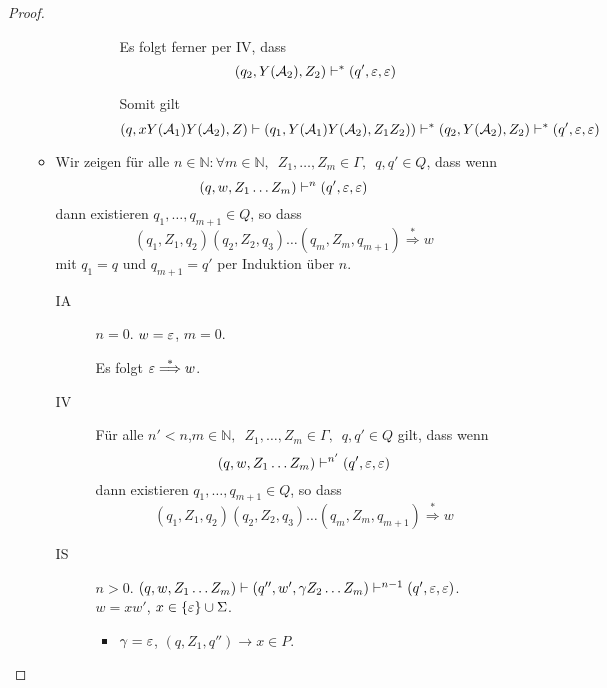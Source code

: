 \begin{proof}
\begin{itemize}
\begin{itemize}
\begin{description}
\begin{itemize}
          Es folgt ferner per IV, dass
          \begin{displaymath}
            (q_2, Y(\mathcal{A}_2), Z_2) \vdash^* (q', \varepsilon, \varepsilon)
          \end{displaymath}

          Somit gilt
          \begin{displaymath}
            (q, xY(\mathcal{A}_1)Y(\mathcal{A}_2), Z) \vdash (q_1, Y(\mathcal{A}_1)Y(\mathcal{A}_2), Z_1Z_2)) \vdash^* (q_2, Y(\mathcal{A}_2), Z_2) \vdash^* (q', \varepsilon, \varepsilon)
          \end{displaymath}
          
          
        \end{itemize}
      \end{description}

    \item Wir zeigen für alle $n \in \mathbb{N}: \forall m \in \mathbb{N},\enspace Z_1,\ldots,Z_m \in \Gamma,\enspace q,q' \in Q$, dass wenn
      \begin{displaymath}
        (q,w,Z_1\ldots Z_m) \vdash^n (q', \varepsilon, \varepsilon)
      \end{displaymath}
      dann existieren $q_1,\ldots,q_{m+1} \in Q$, so dass
      \begin{displaymath}
        (q_1,Z_1,q_2)(q_2,Z_2,q_3)\ldots(q_m,Z_m,q_{m+1}) \stackrel{*}{\Longrightarrow} w
      \end{displaymath}
      mit $q_1 = q$ und $q_{m+1} = q'$ per Induktion über $n$.

      \begin{description}
      \item[IA] $n = 0$.
        $w = \varepsilon$, $m = 0$.

        Es folgt $\varepsilon \stackrel{*}{\Longrightarrow} w$.
      \item[IV] Für alle $n' < n$,\enspace $m \in \mathbb{N},\enspace Z_1,\ldots,Z_m\in \Gamma,\enspace q,q' \in Q$ gilt, dass wenn
        \begin{displaymath}
        (q,w,Z_1\ldots Z_m) \vdash^{n'} (q', \varepsilon, \varepsilon)
      \end{displaymath}
      dann existieren $q_1,\ldots,q_{m+1} \in Q$, so dass
      \begin{displaymath}
        (q_1,Z_1,q_2)(q_2,Z_2,q_3)\ldots(q_m,Z_m,q_{m+1}) \stackrel{*}{\Longrightarrow} w
      \end{displaymath}

    \item[IS] $n > 0$.
      $(q, w, Z_1\ldots Z_m) \vdash (q'', w', \gamma Z_2\ldots Z_m) \vdash^{n-1} (q',\varepsilon, \varepsilon)$.
      $w =xw'$, \enspace $x \in \{\varepsilon\} \cup \Sigma$.
      \begin{itemize}
      \item $\gamma = \varepsilon$, \enspace $(q, Z_1, q'') \to x \in P$.


\end{itemize}
\end{description}
\end{itemize}
\end{itemize}
\end{proof}
